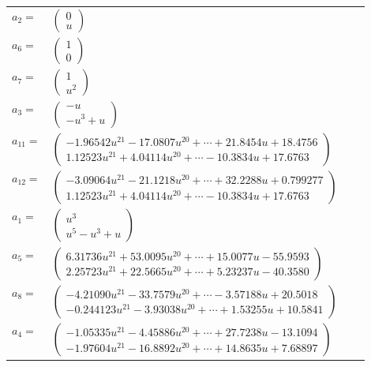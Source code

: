 \documentclass[1p]{elsarticle_modified}
\theoremstyle{definition}
\begin{document}
\begin{tabular}{m{7pt} m{180pt} m{7pt} m{180pt} }
\flushright $a_{2}=$&$\begin{pmatrix}0\\u\end{pmatrix}$ \\
\flushright $a_{6}=$&$\begin{pmatrix}1\\0\end{pmatrix}$ \\
\flushright $a_{7}=$&$\begin{pmatrix}1\\u^2\end{pmatrix}$ \\
\flushright $a_{3}=$&$\begin{pmatrix}- u\\- u^3+u\end{pmatrix}$ \\
\flushright $a_{11}=$&$\begin{pmatrix}-1.96542 u^{21}-17.0807 u^{20}+\cdots+21.8454 u+18.4756\\1.12523 u^{21}+4.04114 u^{20}+\cdots-10.3834 u+17.6763\end{pmatrix}$ \\
\flushright $a_{12}=$&$\begin{pmatrix}-3.09064 u^{21}-21.1218 u^{20}+\cdots+32.2288 u+0.799277\\1.12523 u^{21}+4.04114 u^{20}+\cdots-10.3834 u+17.6763\end{pmatrix}$ \\
\flushright $a_{1}=$&$\begin{pmatrix}u^3\\u^5- u^3+u\end{pmatrix}$ \\
\flushright $a_{5}=$&$\begin{pmatrix}6.31736 u^{21}+53.0095 u^{20}+\cdots+15.0077 u-55.9593\\2.25723 u^{21}+22.5665 u^{20}+\cdots+5.23237 u-40.3580\end{pmatrix}$ \\
\flushright $a_{8}=$&$\begin{pmatrix}-4.21090 u^{21}-33.7579 u^{20}+\cdots-3.57188 u+20.5018\\-0.244123 u^{21}-3.93038 u^{20}+\cdots+1.53255 u+10.5841\end{pmatrix}$ \\
\flushright $a_{4}=$&$\begin{pmatrix}-1.05335 u^{21}-4.45886 u^{20}+\cdots+27.7238 u-13.1094\\-1.97604 u^{21}-16.8892 u^{20}+\cdots+14.8635 u+7.68897\end{pmatrix}$ \\

\end{tabular}
\end{document}

